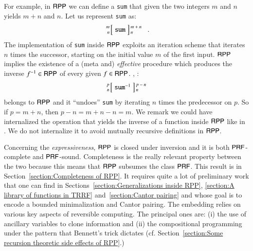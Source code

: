 For example, in $ \mathsf{RPP} $ we can define a \texttt{sum} that given the two integers $ m $ and $ n $
yields $ m+n $ and $ n $. Let us represent \texttt{sum} as:
\begin{align}
\label{align:sum example}
\arraycolsep=1.4pt
\begin{array}{rcl}
 \left. {\scriptsize \begin{array}{r} m    \\ n \end{array}} \right[
 & \texttt{sum} &
 \left] {\scriptsize \begin{array}{l} m + n\\ n \end{array} } \right.
\end{array}
\enspace .
\end{align}
The implementation of \texttt{sum} inside $ \mathsf{RPP} $ exploits an iteration scheme that iterates $ n $
times the successor, starting on the initial value $ m $ of the first input.
$ \mathsf{RPP} $ implies the existence of a (meta and) \emph{effective} procedure which produces 
the inverse $ {f}^{-1}\in\mathsf{RPP} $ of every given $ f\in\mathsf{RPP} $. 
\Ie, :
\begin{align}
\label{align:diff example}
\arraycolsep=1.4pt
\begin{array}{rcl}
 \left. {\scriptsize \begin{array}{r} p    \\ n \end{array}} \right[
 & \rprInv{\texttt{sum}} &
 \left] {\scriptsize \begin{array}{l} p - n\\ n \end{array} } \right.
\end{array}
\end{align}
belongs to $ \mathsf{RPP} $ and it ``undoes'' \texttt{sum} by iterating $ n $ times
the predecessor on $ p $. So if $ p = m + n $, then $ p - n = m + n - n = m$.
We remark we could have internalized the operation that yields the inverse of a 
function inside $\mathsf{RPP}$ like in \cite{matos03tcs}. We do not internalize it
to avoid mutually recursive definitions in $ \mathsf{RPP} $.

Concerning the \emph{expressiveness}, $ \mathsf{RPP} $ is closed under inversion and it is both $ \mathsf{P}\mathsf{RF} $-complete and $ \mathsf{P}\mathsf{RF} $-sound.
Completeness is the really relevant property between the two because this means that 
$ \mathsf{RPP} $ subsumes the class $ \mathsf{P}\mathsf{RF} $.
This result is in  Section~\ref{section:Completeness of RPP}. It requires quite a lot 
of preliminary work that one can find in Sections~\ref{section:Generalizations inside RPP}, 
\ref{section:A library of functions in TRRF} and~\ref{section:Cantor pairing} 
and whose goal is to encode a bounded minimalization and Cantor pairing. 
The embedding relies on various key aspects of reversible computing. The principal
ones are:  (i) the use of ancillary variables to clone information
and (ii) the compositional programming under the pattern that Bennett's trick dictates
(cf. Section~\ref{section:Some recursion theoretic side effects of RPP}.)

